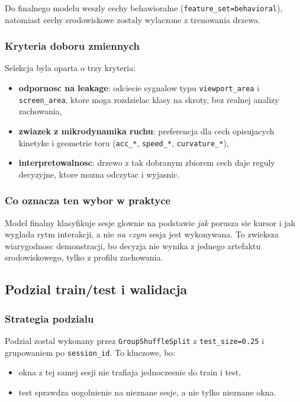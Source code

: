 Do finalnego modelu weszly cechy behawioralne
(\texttt{feature\_set=behavioral}), natomiast cechy srodowiskowe zostaly
wylaczone z trenowania drzewa.

\subsubsection{Kryteria doboru zmiennych}
Selekcja byla oparta o trzy kryteria:
\begin{itemize}
  \item \textbf{odpornosc na leakage}: odciecie sygnalow typu
  \texttt{viewport\_area} i \texttt{screen\_area}, ktore moga rozdzielac klasy
  na skroty, bez realnej analizy zachowania,
  \item \textbf{zwiazek z mikrodynamika ruchu}: preferencja dla cech opisujacych
  kinetyke i geometrie toru (\texttt{acc\_*}, \texttt{speed\_*}, \texttt{curvature\_*}),
  \item \textbf{interpretowalnosc}: drzewo z tak dobranym zbiorem cech daje
  reguly decyzyjne, ktore mozna odczytac i wyjasnic.
\end{itemize}

\subsubsection{Co oznacza ten wybor w praktyce}
Model finalny klasyfikuje sesje glownie na podstawie \emph{jak} porusza sie kursor
i jak wyglada rytm interakcji, a nie \emph{na czym} sesja jest wykonywana.
To zwieksza wiarygodnosc demonstracji, bo decyzja nie wynika z jednego artefaktu
srodowiskowego, tylko z profilu zachowania.

\subsection{Podzial train/test i walidacja}
\subsubsection{Strategia podzialu}
Podzial zostal wykonany przez \texttt{GroupShuffleSplit} z \texttt{test\_size=0.25}
i grupowaniem po \texttt{session\_id}. To kluczowe, bo:
\begin{itemize}
  \item okna z tej samej sesji nie trafiaja jednoczesnie do train i test,
  \item test sprawdza uogolnienie na nieznane sesje, a nie tylko nieznane okna.
\end{itemize}

